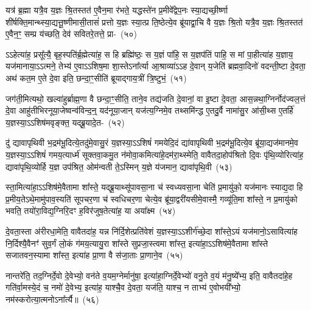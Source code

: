 यत्र॑ ब्र॒ह्मा यत्रै॒व य॒ज्ञः श्रि॒तस्तत॑ ए॒वैन॒मा र॑भते॒ यद्धस्ते॑न प्र॒मीवे᳚द्वेप॒नः स्या॒द्यच्छी॒र्ष्णा शी॑र्\mbox{}षक्ति॒मान्थ्स्या॒द्यत्तू॒ष्णीमासी॒तासं॑ प्रत्तो य॒ज्ञः स्या॒त्प्र ति॒ष्ठेत्ये॒व ब्रू॑याद्वा॒चि वै य॒ज्ञः श्रि॒तो यत्रै॒व य॒ज्ञः श्रि॒तस्तत॑ ए॒वैन॒ꣳ॒ सम्प्र य॑च्छति॒ देव॑ सवितरे॒तत्ते॒ प्रा-~(५०)\ip

ऽऽहेत्या॑ह॒ प्रसू᳚त्यै॒ बृह॒स्पति॑र्ब्र॒ह्मेत्या॑ह॒ स हि ब्रह्मि॑ष्ठः॒ स य॒ज्ञं पा॑हि॒ स य॒ज्ञप॑तिं पाहि॒ स मां पा॒हीत्या॑ह य॒ज्ञाय॒ यज॑मानाया॒\-ऽऽ\-त्मने॒ तेभ्य॑ ए॒वा\-ऽऽ\-शिष॒मा शा॒स्ते\-ऽना᳚र्त्या आ॒श्राव्या॑\-ऽऽ\-ह दे॒वान् य॒जेति॑ ब्रह्मवा॒दिनो॑ वदन्ती॒ष्टा दे॒वता॒ अथ॑ कत॒म ए॒ते दे॒वा इति॒ छन्दा॒ꣳ॒सीति॑ ब्रूयाद्गाय॒त्रीं त्रि॒ष्टुभं॒~(५१)\ip

जग॑ती॒मित्यथो॒ खल्वा॑हुर्ब्राह्म॒णा वै छन्दा॒ꣳ॒सीति॒ ताने॒व तद्य॑जति दे॒वानां॒ वा इ॒ष्टा दे॒वता॒ आस॒न्नथा॒ग्निर्नोद॑ज्वल॒त्तं दे॒वा आहु॑तीभिरनूया॒जेष्वन्व॑विन्द॒न्॒ यद॑नूया॒जान् यज॑त्य॒ग्निमे॒व तथ्समि॑न्द्ध ए॒तदु॒र्वै नामा॑सु॒र आ॑सी॒थ्स ए॒तर्\mbox{}हि॑ य॒ज्ञस्या॒\-ऽऽ\-शिष॑मवृङ्क्त॒ यद्ब्रू॒यादे॒त-~(५२)\ip

दु॑ द्यावापृथिवी भ॒द्रम॑भू॒दित्ये॒तदु॑मे॒वासु॒रं य॒ज्ञस्या॒\-ऽऽ\-शिषं॑ गमयेदि॒दं द्या॑वापृथिवी भ॒द्रम॑भू॒दित्ये॒व ब्रू॑या॒द्यज॑मानमे॒व य॒ज्ञस्या॒\-ऽऽ\-शिषं॑ गमय॒त्यार्ध्म॑ सूक्तवा॒कमु॒त न॑मोवा॒कमित्या॑\-हे॒दम॑रा॒थ्स्मेति॒ वावैतदा॒होप॑श्रितो दि॒वः पृ॑थि॒व्योरित्या॑ह॒ द्यावा॑पृथि॒व्योर्\mbox{}हि य॒ज्ञ उप॑श्रित॒ ओम॑न्वती ते॒\-ऽस्मिन् य॒ज्ञे य॑जमान॒ द्यावा॑\-पृथि॒वी~(५३)\ip

स्ता॒मित्या॑हा॒\-ऽऽ\-शिष॑मे॒वैतामा शा᳚स्ते॒ यद्ब्रू॒याथ्सू॑पावसा॒ना च॑ स्वध्यवसा॒ना चेति॑ प्र॒मायु॑को॒ यज॑मानः स्याद्य॒दा हि प्र॒मीय॒ते\-ऽथे॒मामु॑पाव॒स्यति॑ सूपचर॒णा च॑ स्वधिचर॒णा चेत्ये॒व ब्रू॑या॒द्वरी॑यसीमे॒वास्मै॒ गव्यू॑ति॒मा शा᳚स्ते॒ न प्र॒मायु॑को भवति॒ तयो॑रा॒विद्य॒ग्निरि॒दꣳ ह॒विर॑जुष॒तेत्या॑ह॒ या अया᳚क्ष्म~(५४)\ip

दे॒वता॒स्ता अ॑रीरधा॒मेति॒ वावैतदा॑ह॒ यन्न नि॑र्दि॒शेत्प्रति॑वेशं य॒ज्ञस्या॒\-ऽऽ\-शीर्ग॑च्छे॒दा शा᳚स्ते॒\-ऽयं यज॑मानो॒\-ऽसावित्या॑ह नि॒र्दिश्यै॒वैनꣳ॑ सुव॒र्गं लो॒कं ग॑मय॒त्यायु॒रा शा᳚स्ते सुप्रजा॒स्त्वमा शा᳚स्त॒ इत्या॑हा॒\-ऽऽ\-शिष॑मे॒वैतामा शा᳚स्ते सजातवन॒स्यामा शा᳚स्त॒ इत्या॑ह प्रा॒णा वै स॑जा॒ताः प्रा॒णाने॒व~(५५)\ip

नान्तरे॑ति॒ तद॒ग्निर्दे॒वो दे॒वेभ्यो॒ वन॑ते व॒यम॒ग्नेर्मानु॑षा॒ इत्या॑हा॒ग्निर्दे॒वेभ्यो॑ वनु॒ते व॒यं म॑नु॒ष्ये᳚भ्य॒ इति॒ वावैतदा॑हे॒ह गति॑र्वा॒मस्ये॒दं च॒ नमो॑ दे॒वेभ्य॒ इत्या॑ह॒ याश्चै॒व दे॒वता॒ यज॑ति॒ याश्च॒ न ताभ्य॑ ए॒वोभयी᳚भ्यो॒ नम॑स्करोत्या॒त्मनो\-ऽना᳚र्त्यै॥~(५६)\ip

